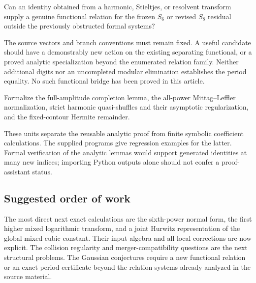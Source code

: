 \begin{question}
Can an identity obtained from a harmonic, Stieltjes, or resolvent
transform supply a genuine functional relation for the frozen
$S_6$ or revised $S_8$ residual outside the previously obstructed
formal systems?
\end{question}
The source vectors and branch conventions must remain fixed. A useful
candidate should have a demonstrably new action on the existing
separating functional, or a proved analytic specialization beyond the
enumerated relation family. Neither additional digits nor an
uncompleted modular elimination establishes the period equality.
No such functional bridge has been proved in this article.

\begin{question}
Formalize the full-amplitude completion lemma, the all-power
Mittag--Leffler normalization, strict harmonic quasi-shuffles and their
asymptotic regularization, and the fixed-contour Hermite remainder.
\end{question}
These units separate the reusable analytic proof from finite symbolic
coefficient calculations. The supplied programs give regression
examples for the latter. Formal verification of the analytic lemmas
would support generated identities at many new indices; importing
Python outputs alone should not confer a proof-assistant status.

\subsection{Suggested order of work}

The most direct next exact calculations are the sixth-power normal
form, the first higher mixed logarithmic transform, and a joint
Hurwitz representation of the global mixed cubic constant. Their input
algebra and all local corrections are now explicit. The collision
regularity and merger-compatibility questions are the next structural
problems. The Gaussian conjectures require a new functional relation or
an exact period certificate beyond the relation systems already
analyzed in the source material.
